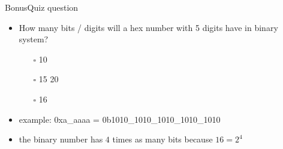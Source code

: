 \begin{frame}{Bonus}{Quiz question}
  \begin{itemize}
    \item How many bits / digits will a hex number with 5 digits have in binary system?
      \begin{itemize}
        \item[$\square$] 10
        \item[$\square$] 15
         20
        \item[$\square$] 16
      \end{itemize}
    \item<2>\alert{example:} 0xa\_aaaa = 0b1010\_1010\_1010\_1010\_1010
    \item<2>the \alert{binary number} has $4$ times as many bits because $16=2^4$
  \end{itemize}
\end{frame}
